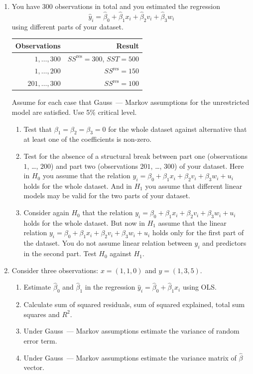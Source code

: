 \documentclass[12pt]{article}
\newcommand{\SSR}{SS^{\text{res}}}
\newcommand{\SST}{SST}
\newcommand{\hb}{\hat\beta}
\begin{document}
\begin{enumerate}
    \item You have $300$ observations in total and you estimated the regression 
    \[
    \hat y_i = \hb_0 + \hb_1 x_i + \hb_2 v_i + \hb_3 w_i
    \]
    using different parts of your dataset.

    \begin{tabular}{rr}
        \toprule
        Observations & Result \\
        \midrule
        $1, \dots, 300$ & $\SSR = 300$, $\SST = 500$ \\
        $1, \dots, 200$ & $\SSR = 150$ \\
        $201, \dots, 300$ & $\SSR = 100$ \\
        \bottomrule
    \end{tabular}


    Assume for each case that Gauss~— Markov assumptions for the unrestricted model are satisfied. 
    Use 5\% critical level. 

    \begin{enumerate}
        \item Test that $\beta_1 = \beta_2 = \beta_3 = 0$ for the whole dataset against alternative that at least one of the coefficients is non-zero.
        \item Test for the absence of a structural break between part one (observations $1$, \dots, $200$) and part two (observations $201$, \dots, $300$) of your dataset.
        Here in $H_0$ you assume that the relation $y_i = \beta_0 + \beta_1 x_i + \beta_2 v_i + \beta_3 w_i + u_i$
        holds for the whole dataset. 
        And in $H_1$ you assume that different linear models may be valid for the two parts of your dataset.
        \item Consider again $H_0$ that the relation $y_i = \beta_0 + \beta_1 x_i + \beta_2 v_i + \beta_3 w_i + u_i$
        holds for the whole dataset.
        But now in $H_1$ assume that the linear relation $y_i = \beta_0 + \beta_1 x_i + \beta_2 v_i + \beta_3 w_i + u_i$
        holds only for the first part of the dataset. 
        You do not assume linear relation between $y_i$ and predictors in the second part.
        Test $H_0$ against $H_1$.
    \end{enumerate}

    \item Consider three observations: $x = (1, 1, 0)$ and $y = (1, 3, 5)$.
    \begin{enumerate}
        \item Estimate $\hb_0$ and $\hb_1$ in the regression $\hat y_i = \hb_0 + \hb_1 x_i$ using OLS.
        \item Calculate sum of squared residuals, sum of squared explained, total sum squares and $R^2$.
        \item Under Gauss~— Markov assumptions estimate the variance of random error term.
        \item Under Gauss~— Markov assumptions estimate the variance matrix of $\hb$ vector. 
    \end{enumerate}


\end{enumerate}
\end{document}
